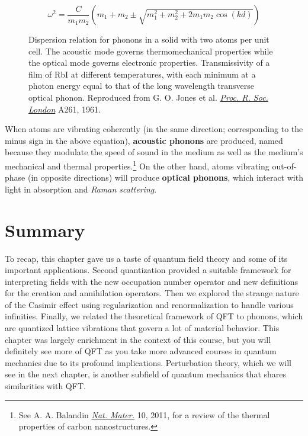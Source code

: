 \begin{equation}
	\omega^2 = \frac{C}{m_1m_2} \left(m_1 + m_2 \pm \sqrt{m_1^2 + m_2^2 + 2m_1m_2\cos(kd)}\right)
\end{equation}

\begin{figure}[!h]
	\centering
	 \hspace{3ex}
	\caption{\protect{} Dispersion relation for phonons in a solid with two atoms per unit cell. The acoustic mode governs thermomechanical properties while the optical mode governs electronic properties. \protect{} Transmissivity of a film of RbI at different temperatures, with each minimum at a photon energy equal to that of the long wavelength transverse optical phonon. Reproduced from G. O. Jones et al. \href{http://rspa.royalsocietypublishing.org/content/261/1304/10}{\emph{Proc. R. Soc. London}} A261, 1961.}
	\label{fig:phonon-modes}
\end{figure}

When atoms are vibrating coherently (in the same direction; corresponding to the minus sign in the above equation), \textbf{acoustic phonons} are produced, named because they modulate the speed of sound in the medium as well as the medium's mechanical and thermal properties.\footnote{See A. A. Balandin \href{https://www.nature.com/nmat/journal/v10/n8/full/nmat3064.html}{\emph{Nat. Mater.}} 10, 2011, for a review of the thermal properties of carbon nanostructures.} 
On the other hand, atoms vibrating out-of-phase (in opposite directions) will produce \textbf{optical phonons}, which interact with light in absorption and \emph{Raman scattering}. 


\section{Summary}

To recap, this chapter gave us a taste of quantum field theory and some of its important applications. 
Second quantization provided a suitable framework for interpreting fields with the new occupation number operator and new definitions for the creation and annihilation operators. 
Then we explored the strange nature of the Casimir effect using regularization and renormalization to handle various infinities. 
Finally, we related the theoretical framework of QFT to phonons, which are quantized lattice vibrations that govern a lot of material behavior. 
This chapter was largely enrichment in the context of this course, but you will definitely see more of QFT as you take more advanced courses in quantum mechanics due to its profound implications. 
Perturbation theory, which we will see in the next chapter, is another subfield of quantum mechanics that shares similarities with QFT.

%